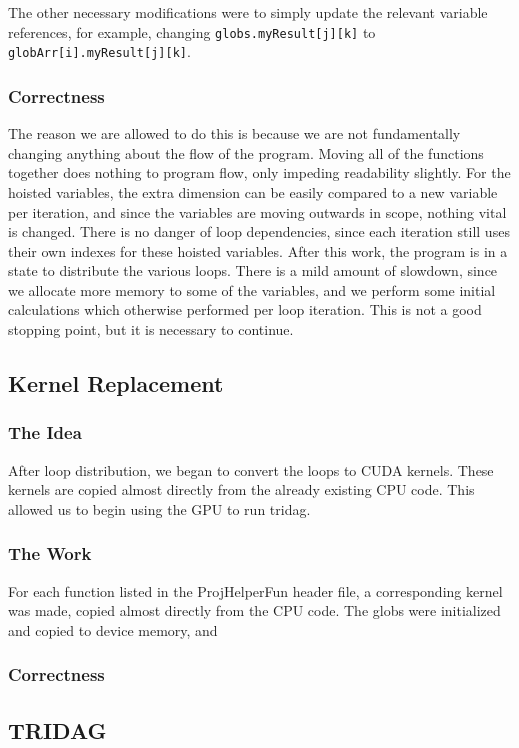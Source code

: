 \documentclass[]{report}
\begin{document}
The other necessary modifications were to simply update the relevant variable references, for example, changing \texttt{globs.myResult[j][k]} to\\ \texttt{globArr[i].myResult[j][k]}.
\subsubsection{Correctness}
The reason we are allowed to do this is because we are not fundamentally changing anything about the flow of the program. Moving all of the functions together does nothing to program flow, only impeding readability slightly. For the hoisted variables, the extra dimension can be easily compared to a new variable per iteration, and since the variables are moving outwards in scope, nothing vital is changed. There is no danger of loop dependencies, since each iteration still uses their own indexes for these hoisted variables.
After this work, the program is in a state to distribute the various loops. There is a mild amount of slowdown, since we allocate more memory to some of the variables, and we perform some initial calculations which otherwise performed per loop iteration. This is not a good stopping point, but it is necessary to continue.
\subsection{Kernel Replacement}
\subsubsection{The Idea}
After loop distribution, we began to convert the loops to CUDA kernels. These kernels are copied almost directly from the already existing CPU code. This allowed us to begin using the GPU to run tridag.
\subsubsection{The Work}
For each function listed in the ProjHelperFun header file, a corresponding kernel was made, copied almost directly from the CPU code. The globs were initialized and copied to device memory, and 
\subsubsection{Correctness}

\subsection{TRIDAG}
\end{document}
